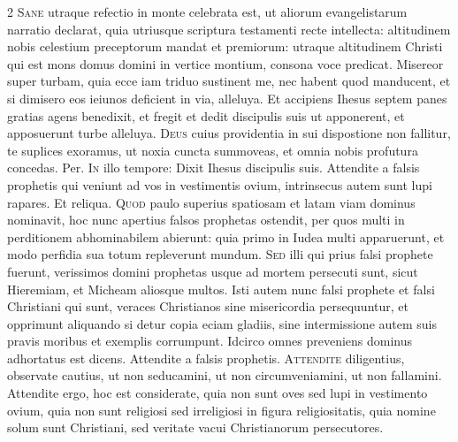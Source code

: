 \begin{multicols*}{2}
\lettrine[lines=2]{\zallmancaps \color{Red} S}{ane} utraque refectio in monte celebrata est, ut aliorum evangelistarum narratio declarat, quia utriusque scriptura testamenti recte intellecta: altitudinem nobis celestium preceptorum mandat et premiorum: utraque altitudinem Christi qui est mons domus domini in vertice montium, consona voce predicat.
 Misereor super turbam, quia ecce iam triduo sustinent me, nec habent quod manducent, et si dimisero eos ieiunos deficient in via, alleluya.
 Et accipiens Ihesus septem panes gratias agens benedixit, et fregit et dedit discipulis suis ut apponerent, et apposuerunt turbe alleluya.
\lettrine[lines=2]{\zallmancaps \color{Blue} D}{eus} cuius providentia in sui dispostione non fallitur, te suplices exoramus, ut noxia cuncta summoveas, et omnia nobis profutura concedas. Per.
\lettrine[lines=2]{\zallmancaps \color{Red} I}{n} illo tempore: Dixit Ihesus discipulis suis. Attendite a falsis prophetis qui veniunt ad vos in vestimentis ovium, intrinsecus autem sunt lupi rapares. Et reliqua.
\lettrine[lines=2]{\zallmancaps \color{Blue} Q}{uod} paulo superius spatiosam et latam viam dominus nominavit, hoc nunc apertius falsos prophetas ostendit, per quos multi in perditionem abhominabilem abierunt: quia primo in Iudea multi apparuerunt, et modo perfidia sua totum repleverunt mundum.
\lettrine[lines=2]{\zallmancaps \color{Red} S}{ed} illi qui prius falsi prophete fuerunt, verissimos domini prophetas usque ad mortem persecuti sunt, sicut Hieremiam, et Micheam aliosque multos. Isti autem nunc falsi prophete et falsi Christiani qui sunt, veraces Christianos sine misericordia persequuntur, et
opprimunt aliquando si detur copia eciam gladiis, sine intermissione autem suis pravis moribus et exemplis corrumpunt. Idcirco omnes preveniens dominus adhortatus est dicens. Attendite a falsis prophetis.
\lettrine[lines=2]{\zallmancaps \color{Blue} A}{ttendite} diligentius, observate cautius, ut non seducamini, ut non circumveniamini, ut non fallamini. Attendite ergo, hoc est considerate, quia non sunt oves sed lupi in vestimento ovium, quia non sunt religiosi sed irreligiosi in figura religiositatis, quia nomine solum sunt Christiani, sed veritate vacui Christianorum persecutores.

\end{multicols*}
